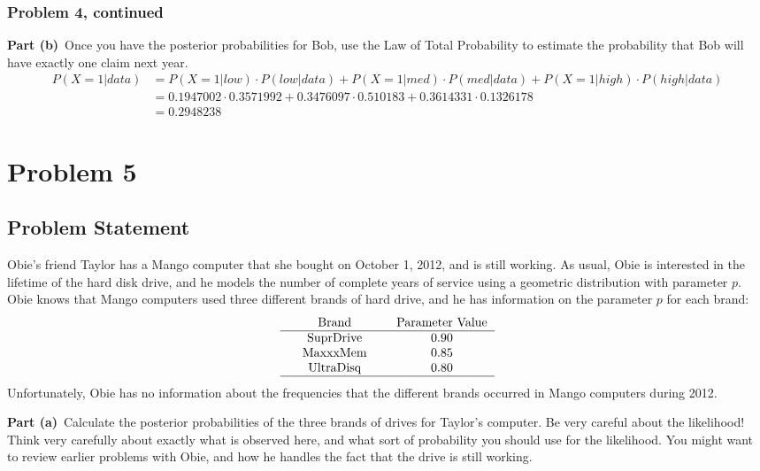 \documentclass[12pt]{article}
\theoremstyle{definition}
\begin{document}
\subsubsection*{Problem 4, continued}
\noindent
{\bf Part (b)}\ Once you have the posterior probabilities for Bob, use the Law of Total Probability to estimate the probability that Bob will have exactly one claim next year.
\begin{align*}
P(X=1|data) &= P(X=1|low)\cdot P(low|data) + P(X=1|med)\cdot P(med|data) + P(X=1|high)\cdot P(high|data)\\
&=  0.1947002 \cdot 0.3571992 +  0.3476097 \cdot 0.510183 +  0.3614331 \cdot 0.1326178 \\
&= 0.2948238
\end{align*}

\newpage
\section*{Problem 5}



\subsection*{Problem Statement}

Obie's friend Taylor has a Mango computer that she bought on October 1, 2012, and is still working. As usual, Obie is interested in the lifetime of the hard disk drive, and he models the number of complete years of service using a geometric distribution with parameter $p$. Obie knows that Mango computers used three different brands of hard drive, and he has information on the parameter $p$ for each brand:
$$
\begin{tabular}{ccccc}
& Brand & & Parameter Value\\
\hline
& SuprDrive & & 0.90\\
& MaxxxMem & & 0.85\\
& UltraDisq & & 0.80\\
\hline 
\end{tabular}
$$
Unfortunately, Obie has no information about the frequencies that the different brands occurred in Mango computers during 2012.

\bigskip
\noindent
{\bf Part (a)}\ Calculate the posterior probabilities of the three brands of drives for Taylor's computer. Be very careful about the likelihood! Think very carefully about exactly what is observed here, and what sort of probability you should use for the likelihood. You might want to review earlier problems with Obie, and how he handles the fact that the drive is still working.
\end{document}

